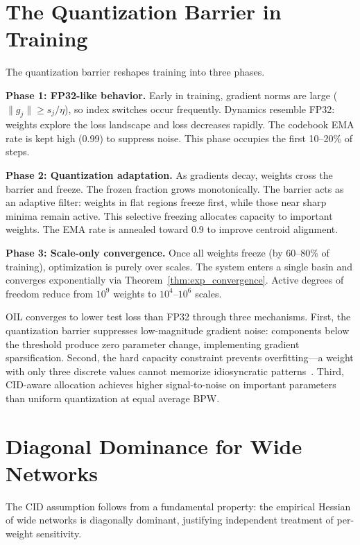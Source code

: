\section{The Quantization Barrier in Training}
\label{sec:quantization_barrier_training}

The quantization barrier reshapes training into three phases.

\textbf{Phase 1: FP32-like behavior.}  Early in training, gradient norms
are large ($\|g_j\| \geq s_j / \eta$), so index switches occur frequently.
Dynamics resemble FP32: weights explore the loss landscape and loss
decreases rapidly.  The codebook EMA rate is kept high (0.99) to suppress
noise.  This phase occupies the first 10--20\% of steps.

\textbf{Phase 2: Quantization adaptation.}  As gradients decay, weights
cross the barrier and freeze.  The frozen fraction grows monotonically.
The barrier acts as an adaptive filter: weights in flat regions freeze
first, while those near sharp minima remain active.  This selective
freezing allocates capacity to important weights.  The EMA rate is
annealed toward 0.9 to improve centroid alignment.

\textbf{Phase 3: Scale-only convergence.}  Once all weights freeze (by
60--80\% of training), optimization is purely over scales.  The system
enters a single basin and converges exponentially via
Theorem~\ref{thm:exp_convergence}.  Active degrees of freedom reduce from
$10^9$ weights to $10^4$--$10^6$ scales.

OIL converges to lower test loss than FP32 through three mechanisms.
First, the quantization barrier suppresses low-magnitude gradient noise:
components below the threshold produce zero parameter change, implementing
gradient sparsification.  Second, the hard capacity constraint prevents
overfitting---a weight with only three discrete values cannot memorize
idiosyncratic patterns~\cite{li2020}.  Third, CID-aware allocation achieves
higher signal-to-noise on important parameters than uniform quantization
at equal average BPW.

\section{Diagonal Dominance for Wide Networks}
\label{sec:diagonal_dominance}

The CID assumption follows from a fundamental property: the empirical
Hessian of wide networks is diagonally dominant, justifying independent
treatment of per-weight sensitivity.

